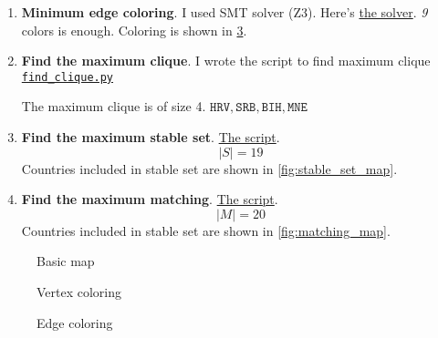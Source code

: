 \documentclass[12pt, a4paper]{article}
\begin{document}
\begin{enumerate}[label=\alph*)]
\item \textbf{Minimum edge coloring}. I used SMT solver (Z3). Here's
\href{https://github.com/ablearthy-itmo-39828cf299f04949c86/discrete-math-2-hw-1/blob/8bc76f0/auto/edge_coloring.py}{the
solver}.
\textit{9} colors is enough. Coloring is shown in \cref{fig:edge_coloring_map}.

\item \textbf{Find the maximum clique}. I wrote the script to find maximum
clique
\href{https://github.com/ablearthy-itmo-39828cf299f04949c86/discrete-math-2-hw-1/blob/1c391015b3b3a8822ac5e7c6f949004ca919e267/auto/find_clique.py}{\texttt{find\_clique.py}}

The maximum clique is of size 4.
\(\texttt{HRV}, \texttt{SRB}, \texttt{BIH}, \texttt{MNE}\)

\item \textbf{Find the maximum stable set}. \href{https://github.com/ablearthy-itmo-39828cf299f04949c86/discrete-math-2-hw-1/blob/79a6584/auto/stable_set.py}{The script}.
\[|S| = 19\]
Countries included in stable set are shown in \cref{fig:stable_set_map}.

\item \textbf{Find the maximum matching}.
\href{https://github.com/ablearthy-itmo-39828cf299f04949c86/discrete-math-2-hw-1/blob/1fae45a/auto/matching.py}{The
script}.
\[|M| = 20\]
Countries included in stable set are shown in \cref{fig:matching_map}.



\end{enumerate}



\begin{landscape}
\begin{figure}
\centering

\caption{Basic map}\label{fig:map_basic}
\end{figure}
\end{landscape}

\begin{landscape}
\begin{figure}
\centering

\caption{Vertex coloring}\label{fig:vertex_coloring_map}
\end{figure}
\end{landscape}

\begin{landscape}
\begin{figure}
\centering

\caption{Edge coloring}\label{fig:edge_coloring_map}
\end{figure}
\end{landscape}
\end{document}
